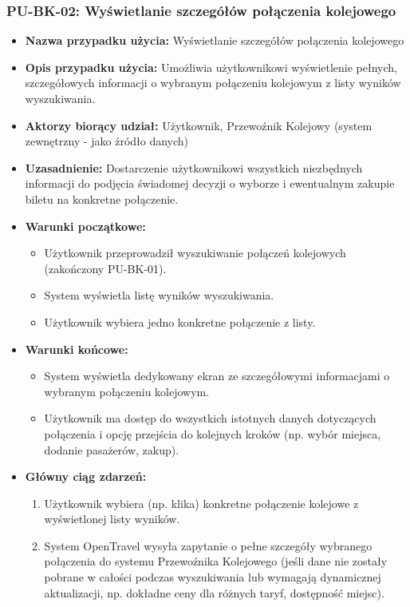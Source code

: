 \documentclass[a4paper,12pt]{article}
\begin{document}
\subsubsection{PU-BK-02: Wyświetlanie szczegółów połączenia kolejowego}
\begin{itemize}
\item \textbf{Nazwa przypadku użycia:} Wyświetlanie szczegółów połączenia kolejowego
\item \textbf{Opis przypadku użycia:} Umożliwia użytkownikowi wyświetlenie pełnych, szczegółowych informacji o wybranym połączeniu kolejowym z listy wyników wyszukiwania.
\item \textbf{Aktorzy biorący udział:} Użytkownik, Przewoźnik Kolejowy (system zewnętrzny - jako źródło danych)
\item \textbf{Uzasadnienie:} Dostarczenie użytkownikowi wszystkich niezbędnych informacji do podjęcia świadomej decyzji o wyborze i ewentualnym zakupie biletu na konkretne połączenie.
\item \textbf{Warunki początkowe:}
\begin{itemize}
\item Użytkownik przeprowadził wyszukiwanie połączeń kolejowych (zakończony PU-BK-01).
\item System wyświetla listę wyników wyszukiwania.
\item Użytkownik wybiera jedno konkretne połączenie z listy.
\end{itemize}
\item \textbf{Warunki końcowe:}
\begin{itemize}
\item System wyświetla dedykowany ekran ze szczegółowymi informacjami o wybranym połączeniu kolejowym.
\item Użytkownik ma dostęp do wszystkich istotnych danych dotyczących połączenia i opcję przejścia do kolejnych kroków (np. wybór miejsca, dodanie pasażerów, zakup).
\end{itemize}
\item \textbf{Główny ciąg zdarzeń:}
\begin{enumerate}
\item Użytkownik wybiera (np. klika) konkretne połączenie kolejowe z wyświetlonej listy wyników.
\item System OpenTravel wysyła zapytanie o pełne szczegóły wybranego połączenia do systemu Przewoźnika Kolejowego (jeśli dane nie zostały pobrane w całości podczas wyszukiwania lub wymagają dynamicznej aktualizacji, np. dokładne ceny dla różnych taryf, dostępność miejsc).

\end{enumerate}
\end{itemize}
\end{document}
